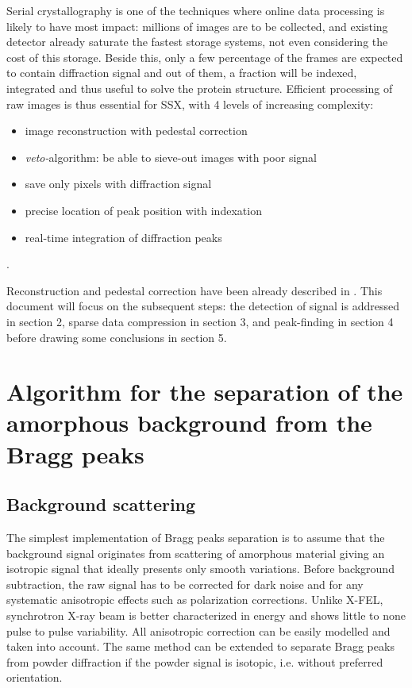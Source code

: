 \documentclass[preprint]{iucr}              %
\begin{document}
Serial crystallography is one of the techniques where online data processing is likely to have most impact:
millions of images are to be collected, and existing detector already saturate the fastest storage systems, not even considering the cost of this storage.
Beside this, only a few percentage of the frames are expected to contain diffraction signal and out of them, a fraction will be indexed, integrated and thus useful to solve the protein structure.
Efficient processing of raw images is thus essential for SSX, with 4 levels of increasing complexity:
\begin{itemize}
    \item image reconstruction with pedestal correction
    \item \textit{veto-}algorithm: be able to sieve-out images with poor signal
    \item save only pixels with diffraction signal
    \item precise location of peak position with indexation \cite{toro}
    \item real-time integration of diffraction peaks
\end{itemize}.

Reconstruction and pedestal correction have been already described in .
This document will focus on the subsequent steps: the detection of signal is addressed in section 2, sparse data compression in section 3, and peak-finding in section 4 before drawing some conclusions in section 5.





\section{Algorithm for the separation of the amorphous background from the Bragg peaks}
\subsection{Background scattering}
The simplest implementation of Bragg peaks separation is to assume that the background signal originates from scattering of amorphous material 
giving an isotropic signal that ideally presents only smooth variations.
Before background subtraction, the raw signal has to be corrected for dark noise and for any systematic anisotropic effects such as polarization corrections.
Unlike X-FEL, synchrotron X-ray beam is better characterized in energy and shows little to none pulse to pulse variability.
All anisotropic correction can be easily modelled and taken into account.
The same method can be extended to separate Bragg peaks from powder diffraction if the powder signal is isotopic, i.e. without preferred orientation. 
\end{document}
